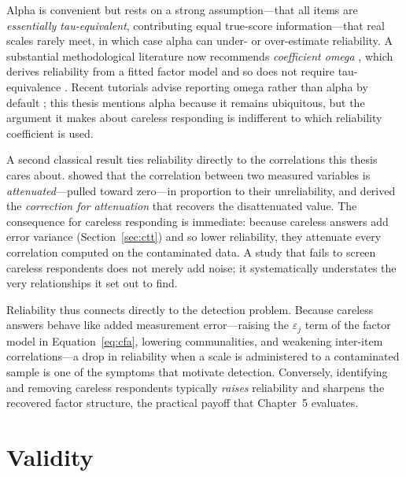 Alpha is convenient but rests on a strong assumption---that all items are
\emph{essentially tau-equivalent}, contributing equal true-score
information---that real scales rarely meet, in which case alpha can under- or
over-estimate reliability. A substantial methodological literature now
recommends \emph{coefficient omega} \parencite{mcdonald1999test}, which derives
reliability from a fitted factor model and so does not require tau-equivalence
\parencite{sijtsma2009use, revellezinbarg2009coefficients}. Recent tutorials
advise reporting omega rather than alpha by default
\parencite{hayescoutts2020use, mcneish2018thanks, flora2020your}; this thesis
mentions alpha because it remains ubiquitous, but the argument it makes about
careless responding is indifferent to which reliability coefficient is used.

A second classical result ties reliability directly to the correlations this
thesis cares about. \textcite{spearman1904proof} showed that the correlation
between two measured variables is \emph{attenuated}---pulled toward zero---in
proportion to their unreliability, and derived the \emph{correction for
attenuation} that recovers the disattenuated value. The consequence for careless
responding is immediate: because careless answers add error variance
(Section~\ref{sec:ctt}) and so lower reliability, they attenuate every
correlation computed on the contaminated data. A study that fails to screen
careless respondents does not merely add noise; it systematically understates
the very relationships it set out to find.

Reliability thus connects directly to the detection problem. Because careless
answers behave like added measurement error---raising the $\varepsilon_j$ term
of the factor model in Equation~\ref{eq:cfa}, lowering communalities, and
weakening inter-item correlations---a drop in reliability when a scale is
administered to a contaminated sample is one of the symptoms that motivate
detection. Conversely, identifying and removing careless respondents typically
\emph{raises} reliability and sharpens the recovered factor structure, the
practical payoff that Chapter~5 evaluates.

\section{Validity}
\label{sec:validity}

